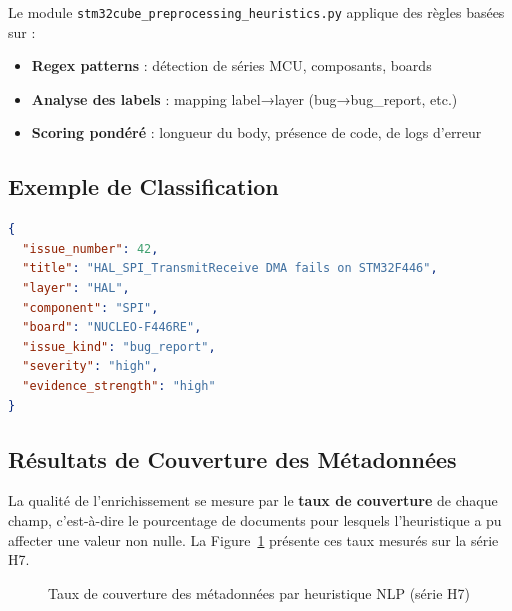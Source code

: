 \documentclass[12pt,a4paper]{report}
\begin{document}
Le module \texttt{stm32cube\_preprocessing\_heuristics.py} applique des règles basées sur :
\begin{itemize}
  \item \textbf{Regex patterns} : détection de séries MCU, composants, boards
  \item \textbf{Analyse des labels} : mapping label→layer (bug→bug\_report, etc.)
  \item \textbf{Scoring pondéré} : longueur du body, présence de code, de logs d'erreur
\end{itemize}

\subsection{Exemple de Classification}

\begin{lstlisting}[language=json]
{
  "issue_number": 42,
  "title": "HAL_SPI_TransmitReceive DMA fails on STM32F446",
  "layer": "HAL",
  "component": "SPI", 
  "board": "NUCLEO-F446RE",
  "issue_kind": "bug_report",
  "severity": "high",
  "evidence_strength": "high"
}
\end{lstlisting}

\subsection{Résultats de Couverture des Métadonnées}
\label{sec:enrichment_coverage}

La qualité de l'enrichissement se mesure par le \textbf{taux de couverture} de chaque champ, c'est-à-dire le pourcentage de documents pour lesquels l'heuristique a pu affecter une valeur non nulle. La Figure~\ref{fig:enrichment_coverage} présente ces taux mesurés sur la série H7.

\begin{figure}[H]
\centering
{}
\caption{Taux de couverture des métadonnées par heuristique NLP (série H7)}
\label{fig:enrichment_coverage}
\end{figure}
\end{document}
